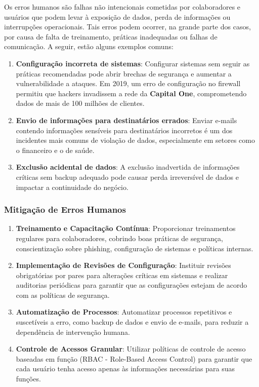 \documentclass[12pt,oneside,a4paper,article]{abntex2}
\begin{document}
Os erros humanos são falhas não intencionais cometidas por colaboradores e usuários que podem levar à exposição de dados, perda de informações ou interrupções operacionais. Tais erros podem ocorrer, na grande parte dos casos, por causa de falta de treinamento, práticas inadequadas ou falhas de comunicação. A seguir, estão alguns exemplos comuns:

\begin{enumerate}
    \item \textbf{Configuração incorreta de sistemas}: Configurar sistemas sem seguir as práticas recomendadas pode abrir brechas de segurança e aumentar a vulnerabilidade a ataques. Em 2019, um erro de configuração no firewall permitiu que hackers invadissem a rede da \textbf{Capital One}, comprometendo dados de mais de 100 milhões de clientes.

    \item \textbf{Envio de informações para destinatários errados}: Enviar e-mails contendo informações sensíveis para destinatários incorretos é um dos incidentes mais comuns de violação de dados, especialmente em setores como o financeiro e o de saúde.

    \item \textbf{Exclusão acidental de dados}: A exclusão inadvertida de informações críticas sem backup adequado pode causar perda irreversível de dados e impactar a continuidade do negócio.
\end{enumerate}

\subsubsection{Mitigação de Erros Humanos}

\begin{enumerate}
    \item \textbf{Treinamento e Capacitação Contínua}: Proporcionar treinamentos regulares para colaboradores, cobrindo boas práticas de segurança, conscientização sobre phishing, configuração de sistemas e políticas internas.

    \item \textbf{Implementação de Revisões de Configuração}: Instituir revisões obrigatórias por pares para alterações críticas em sistemas e realizar auditorias periódicas para garantir que as configurações estejam de acordo com as políticas de segurança.

    \item \textbf{Automatização de Processos}: Automatizar processos repetitivos e suscetíveis a erro, como backup de dados e envio de e-mails, para reduzir a dependência de intervenção humana.

    \item \textbf{Controle de Acessos Granular}: Utilizar políticas de controle de acesso baseadas em função (RBAC - Role-Based Access Control) para garantir que cada usuário tenha acesso apenas às informações necessárias para suas funções.
\end{enumerate}
\end{document}
